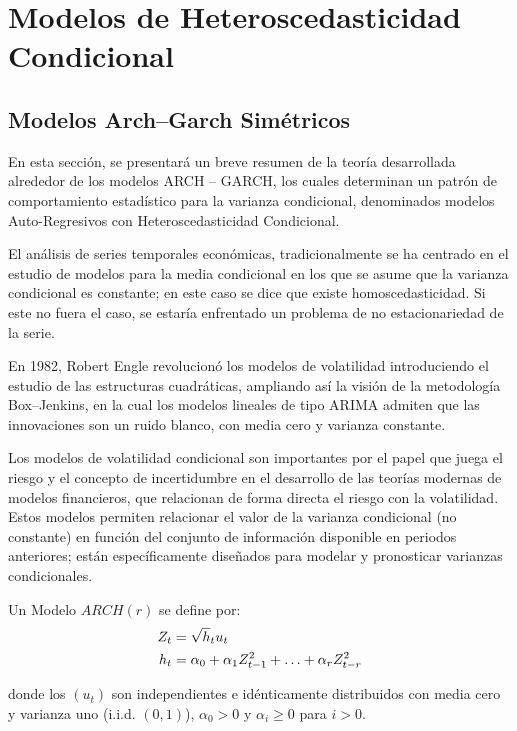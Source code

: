 \chapter{Modelos de Heteroscedasticidad Condicional}

\section{Modelos Arch--Garch Sim\'{e}tricos}

En esta secci\'{o}n, se presentar\'{a} un breve resumen de la teor\'{i}a desarrollada alrededor de los modelos ARCH -- GARCH, los cuales determinan un patr\'{o}n de comportamiento estad\'{i}stico para la varianza condicional, denominados modelos Auto-Regresivos con Heteroscedasticidad Condicional.\newline

El an\'{a}lisis de series temporales econ\'{o}micas, tradicionalmente se ha centrado en el estudio de modelos para la media condicional en los que se asume que la varianza condicional es constante; en este caso se dice que existe homoscedasticidad. Si este no fuera el caso, se estar\'{i}a enfrentado un problema de no estacionariedad de la serie.\newline

En 1982, Robert Engle revolucion\'{o} los modelos de volatilidad introduciendo el estudio de las estructuras cuadr\'{a}ticas, ampliando as\'{i} la visi\'{o}n de la metodolog\'{i}a Box--Jenkins, en la cual los modelos lineales de tipo ARIMA admiten que las innovaciones son un ruido blanco, con media cero y varianza constante.\newline

Los modelos de volatilidad condicional son importantes por el papel que juega el riesgo y el concepto de incertidumbre en el desarrollo de las teor\'{i}as modernas de modelos financieros, que relacionan de forma directa el riesgo con la volatilidad. Estos modelos permiten relacionar el valor de la varianza condicional (no constante) en funci\'{o}n del conjunto de informaci\'{o}n disponible en periodos anteriores; est\'{a}n espec\'{i}ficamente dise\~{n}ados para modelar y pronosticar varianzas condicionales.

\begin{definicion}
 Un Modelo $ARCH(r)$ se define por:
\begin{align*}
 Z_{t} &= \sqrt h_{t} u_{t} \\ 
 h_{t} &= \alpha_{0}+\alpha_{1}Z_{t-1}^{2}+\mathellipsis +\alpha_{r}Z_{t-r}^{2}
\end{align*}

donde los $(u_{t})$ son independientes e id\'{e}nticamente distribuidos con media cero y varianza uno (i.i.d. $(0,1)$), $\alpha_{0}>0$ y $\alpha_{i}\geq 0$ para $i>0$.
\end{definicion}

